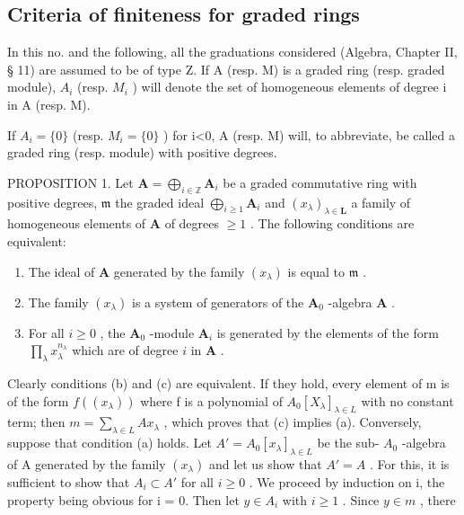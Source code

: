 \subsection{Criteria of finiteness for graded rings}

In this no. and the following, all the graduations considered (Algebra, Chapter II, § 11) are assumed to be of type Z. If A (resp. M) is a graded ring (resp. graded module), \(A_{i}\) (resp. \(M_{i}\) ) will denote the set of homogeneous elements of degree i in A (resp. M).

If \(A_{i}=\{0\}\) (resp. \(M_{i}=\{0\}\) ) for i\textless0, A (resp. M) will, to abbreviate, be called a graded ring (resp. module) with positive degrees.

PROPOSITION 1. Let \(\mathbf{A} = \bigoplus_{i\in \mathbb{Z}}\mathbf{A}_i\) be a graded commutative ring with positive degrees, \(\mathfrak{m}\) the graded ideal \(\bigoplus_{i\geqslant 1}\mathbf{A}_i\) and \((x_{\lambda})_{\lambda \in \mathbf{L}}\) a family of homogeneous elements of \(\mathbf{A}\) of degrees \(\geqslant 1\) . The following conditions are equivalent:

\begin{enumerate}
\def\labelenumi{(\alph{enumi})}
\item
  The ideal of \(\mathbf{A}\) generated by the family \((x_{\lambda})\) is equal to \(\mathfrak{m}\) .
\item
  The family \((x_{\lambda})\) is a system of generators of the \(\mathbf{A}_0\) -algebra \(\mathbf{A}\) .
\item
  For all \(i \geqslant 0\) , the \(\mathbf{A}_0\) -module \(\mathbf{A}_i\) is generated by the elements of the form \(\prod_{\lambda} x_{\lambda}^{n_{\lambda}}\) which are of degree \(i\) in \(\mathbf{A}\) .
\end{enumerate}

Clearly conditions (b) and (c) are equivalent. If they hold, every element of m is of the form \(f((x_{\lambda}))\) where f is a polynomial of \(A_{0}[X_{\lambda}]_{\lambda \in L}\) with no constant term; then \(m = \sum_{\lambda \in L} Ax_{\lambda}\) , which proves that (c) implies (a). Conversely, suppose that condition (a) holds. Let \(A' = A_{0}[x_{\lambda}]_{\lambda \in L}\) be the sub- \(A_{0}\) -algebra of A generated by the family \((x_{\lambda})\) and let us show that \(A' = A\) . For this, it is sufficient to show that \(A_{i} \subset A'\) for all \(i \geqslant 0\) . We proceed by induction on i, the property being obvious for i = 0. Then let \(y \in A_{i}\) with \(i \geqslant 1\) . Since \(y \in m\) , there

